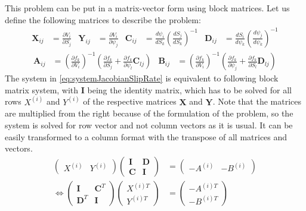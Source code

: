 \documentclass{report}
\begin{document}
This problem can be put in a matrix-vector form using block matrices. Let us define the following matrices to describe the problem:
\begin{align}
	\mathbf{X}_{ij} &= \frac{\partial V_i}{\partial S_j} &
	\mathbf{Y}_{ij} &= \frac{\partial V_i}{\partial \psi_j} &
	\mathbf{C}_{ij} &= \frac{d\psi_i}{dS_k}\left(\frac{d S_j}{d S_k}\right)^{-1} &
	\mathbf{D}_{ij} &= \frac{dS_i}{d\psi_k}\left(\frac{d \psi_j}{d \psi_k}\right)^{-1} 
\end{align}
\begin{align}
	\mathbf{A}_{ij} &= \left(\frac{\partial f_k}{\partial V_i}\right)^{-1}\left(\frac{\partial f_k}{\partial S_j} + \frac{\partial f_k}{\partial \psi_l}\mathbf{C}_{lj} \right) &
	\mathbf{B}_{ij} &= \left(\frac{\partial f_k}{\partial V_i}\right)^{-1}\left(\frac{\partial f_k}{\partial \psi_j} + \frac{\partial f_k}{\partial S_l}\mathbf{D}_{lj} \right)
\end{align}
The system in \autoref{eq:systemJacobianSlipRate} is equivalent to following block matrix system, with $\mathbf{I}$ being the identity matrix, which has to be solved for all rows $X^{(i)}$ and $Y^{(i)}$ of the respective matrices $\mathbf{X}$ and $\mathbf{Y}$. Note that the matrices are multiplied from the right because of the formulation of the problem, so the system is solved for row vector and not column vectors as it is usual. It can be easily transformed to a column format with the transpose of all matrices and vectors.
\begin{align}
	\begin{pmatrix}
		X^{(i)} & Y^{(i)}
	\end{pmatrix} \begin{pmatrix}
					  \mathbf{I} & \mathbf{D} \\
					  \mathbf{C} & \mathbf{I} 
				  \end{pmatrix}  &= \begin{pmatrix}
									  -A^{(i)} & -B^{(i)}
								   \end{pmatrix} \\
	\Leftrightarrow
	\begin{pmatrix}
		\mathbf{I} & \mathbf{C}^T \\
		\mathbf{D}^T & \mathbf{I} 
	\end{pmatrix} 	\begin{pmatrix}
						X^{(i)T} \\ Y^{(i)T}
					\end{pmatrix} &= \begin{pmatrix}
										-A^{(i)T} \\ -B^{(i)T}
									 \end{pmatrix} 
\end{align}
\end{document}
